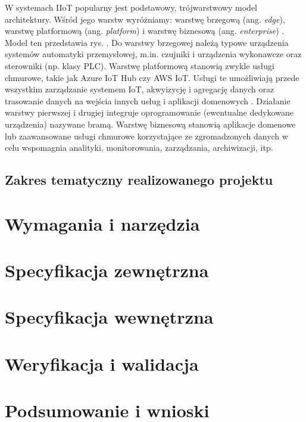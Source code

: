 \documentclass[a4paper, 12pt, twoside]{article}
\begin{document}
W systemach IIoT popularny jest podstawowy, trójwarstwowy model architektury. Wśród jego
warstw wyróżniamy: warstwę brzegową (ang. \emph{edge}), warstwę platformową (ang. \emph{platform})
i warstwę biznesową (ang. \emph{enterprise}) \cite{iiot-challenges-opportunities-directions}.
Model ten przedstawia rys. .
Do warstwy brzegowej należą
typowe urządzenia systemów automatyki przemysłowej, m.in. czujniki i urządzenia wykonawcze oraz
sterowniki (np. klasy PLC). Warstwę platformową stanowią zwykle usługi chmurowe,
takie jak Azure IoT Hub czy AWS IoT. Usługi te umożliwiają przede wszystkim zarządzanie
systemem IoT, akwyizycję i agregację danych oraz trasowanie danych na wejścia 
innych usług i aplikacji domenowych \cite{models-innovative-iot}. Działanie
warstwy pierwszej i drugiej integruje oprogramowanie (ewentualne dedykowane urządzenia)
nazywane bramą. Warstwę biznesową
stanowią aplikacje domenowe lub zaawansowane usługi chmurowe
korzystające ze zgromadzonych danych w celu wspomagnia
analityki, monitorowania, zarządzania, archiwizacji, itp. 

\subsection{Zakres tematyczny realizowanego projektu}


\section{Wymagania i narzędzia}

\section{Specyfikacja zewnętrzna}

\section{Specyfikacja wewnętrzna}

\section{Weryfikacja i walidacja}

\section{Podsumowanie i wnioski}

\printbibliography
\end{document}
